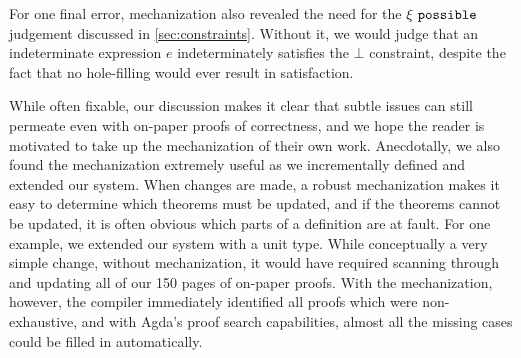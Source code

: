 For one final error, mechanization also revealed the need for the $\xi ~\mathtt{possible}$ judgement discussed in \autoref{sec:constraints}. Without it, we would judge that an indeterminate expression $e$ indeterminately satisfies the $\bot$ constraint, despite the fact that no hole-filling would ever result in satisfaction.

While often fixable, our discussion makes it clear that subtle issues can still permeate even with on-paper proofs of correctness, and we hope the reader is motivated to take up the mechanization of their own work. Anecdotally, we also found the mechanization extremely useful as we incrementally defined and extended our system. When changes are made, a robust mechanization makes it easy to determine which theorems must be updated, and if the theorems cannot be updated, it is often obvious which parts of a definition are at fault. For one example, we extended our system with a unit type. While conceptually a very simple change, without mechanization, it would have required scanning through and updating all of our 150 pages of on-paper proofs. With the mechanization, however, the compiler immediately identified all proofs which were non-exhaustive, and with Agda's proof search capabilities, almost all the missing cases could be filled in automatically. 
